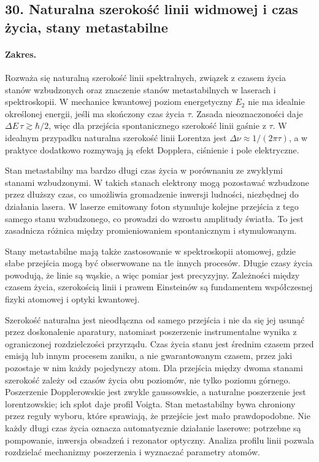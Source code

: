 \documentclass[11pt,a4paper]{article}
\begin{document}
\subsection{30. Naturalna szerokość linii widmowej i czas życia, stany metastabilne}
\paragraph{Zakres.} Rozważa się naturalną szerokość linii spektralnych, związek z czasem życia stanów wzbudzonych oraz znaczenie stanów metastabilnych w laserach i spektroskopii. W mechanice kwantowej poziom energetyczny $E_2$ nie ma idealnie określonej energii, jeśli ma skończony czas życia $\tau$. Zasada nieoznaczoności daje $\Delta E\,\tau\gtrsim \hbar/2$, więc dla przejścia spontanicznego szerokość linii gaśnie z $\tau$. W idealnym przypadku naturalna szerokość linii Lorentza jest $\Delta\nu\approx 1/(2\pi\tau)$, a w praktyce dodatkowo rozmywają ją efekt Dopplera, ciśnienie i pole elektryczne.\par
Stan metastabilny ma bardzo długi czas życia w porównaniu ze zwykłymi stanami wzbudzonymi. W takich stanach elektrony mogą pozostawać wzbudzone przez dłuższy czas, co umożliwia gromadzenie inwersji ludności, niezbędnej do działania lasera. W laserze emitowany foton stymuluje kolejne przejścia z tego samego stanu wzbudzonego, co prowadzi do wzrostu amplitudy światła. To jest zasadnicza różnica między promieniowaniem spontanicznym i stymulowanym.\par
Stany metastabilne mają także zastosowanie w spektroskopii atomowej, gdzie słabe przejścia mogą być obserwowane na tle innych procesów. Długie czasy życia powodują, że linie są wąskie, a więc pomiar jest precyzyjny. Zależności między czasem życia, szerokością linii i prawem Einsteinów są fundamentem współczesnej fizyki atomowej i optyki kwantowej.\par

Szerokość naturalna jest nieodłączna od samego przejścia i nie da się jej usunąć przez doskonalenie aparatury, natomiast poszerzenie instrumentalne wynika z ograniczonej rozdzielczości przyrządu. Czas życia stanu jest średnim czasem przed emisją lub innym procesem zaniku, a nie gwarantowanym czasem, przez jaki pozostaje w nim każdy pojedynczy atom. Dla przejścia między dwoma stanami szerokość zależy od czasów życia obu poziomów, nie tylko poziomu górnego. Poszerzenie Dopplerowskie jest zwykle gaussowskie, a naturalne poszerzenie jest lorentzowskie; ich splot daje profil Voigta. Stan metastabilny bywa chroniony przez reguły wyboru, które sprawiają, że przejście jest mało prawdopodobne. Nie każdy długi czas życia oznacza automatycznie działanie laserowe: potrzebne są pompowanie, inwersja obsadzeń i rezonator optyczny. Analiza profilu linii pozwala rozdzielać mechanizmy poszerzenia i wyznaczać parametry atomów.
\par
\end{document}
